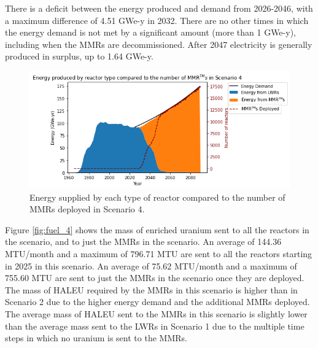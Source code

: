 There is a deficit between the energy produced and  
demand from 2026-2046, with a maximum difference of 4.51 GWe-y in 2032.
There are no other times in which the energy demand is not met by a 
significant amount (more than 1 GWe-y), including when the \glspl{MMR} are 
decommissioned. After 2047 electricity is generally produced in surplus, 
up to 1.64 GWe-y. 

\begin{figure}
    \centering 
    \includegraphics[width=\textwidth]{../figures/energy_scenario4.png}
    \caption{Energy supplied by each type of reactor compared to the number of 
    \glspl{MMR} deployed in Scenario 4.}
    \label{fig:energy_rx_4}
\end{figure}

Figure \ref{fig:fuel_4} shows the mass of enriched uranium sent to all the 
reactors in the scenario, and to just the \glspl{MMR} 
in the scenario. An average of 144.36 MTU/month and a maximum of 796.71 MTU
are sent to all the reactors starting in 2025 in this scenario. An average of 
75.62 MTU/month and a maximum of 755.60 MTU are sent to just the \glspl{MMR}
in the scenario once they are deployed. The mass of \gls{HALEU}
required by the \glspl{MMR} in this scenario is higher than  
in Scenario 2 due to the higher energy 
demand and the additional \glspl{MMR} deployed. The 
average mass of \gls{HALEU} sent to the \glspl{MMR} in this scenario is 
slightly lower than the average mass sent to the \glspl{LWR} in Scenario 1 
due to the multiple time steps in which no uranium is sent to the \glspl{MMR}.

